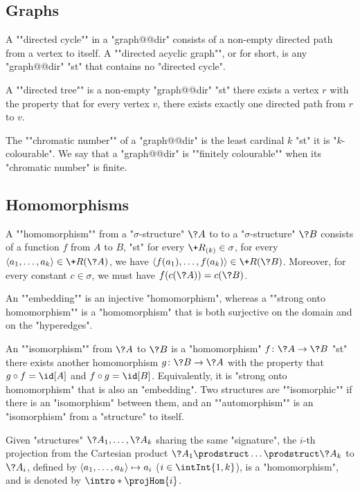 \subsection{Graphs}

A \AP""directed cycle"" in a "graph@@dir" consists
of a non-empty directed path from a vertex to itself.
A ""directed acyclic graph"", or  for short,
is any "graph@@dir" "st" that contains no "directed cycle".

A ""directed tree"" is a non-empty "graph@@dir" "st" there exists 
a vertex $r$ with the property that for every vertex $v$,
there exists exactly one directed path from $r$ to $v$.

The ""chromatic number"" of a "graph@@dir" is the least cardinal $k$
"st" it is "$k$-colourable". We say that a "graph@@dir"
is \AP""finitely colourable"" when its "chromatic number" is finite.


\subsection{Homomorphisms}

A \AP""homomorphism"" from a "$\sigma$-structure" $\?A$ to
to a "$\sigma$-structure" $\?B$ consists of a function $f$ from $A$ to $B$,
"st" for every $\+R_{(k)} \in \sigma$, for every $\tup{a_1,\dotsc,a_k} \in \+R(\?A)$,
we have $\tup{f(a_1), \dotsc, f(a_k)} \in \+R(\?B)$. Moreover, for every
constant $c \in \sigma$, we must have $f(c(\?A)) = c(\?B)$.

An \AP""embedding"" is an injective "homomorphism",
whereas a \AP""strong onto homomorphism"" is a "homomorphism" that is both
surjective on the domain and on the "hyperedges". 

An \AP""isomorphism"" from $\?A$ to $\?B$ is a "homomorphism" $f\colon \?A \to \?B$
"st" there exists another homomorphism $g\colon \?B \to \?A$ with the property
that $g \circ f = \id[A]$ and $f \circ g = \id[B]$. Equivalently,
it is "strong onto homomorphism" that is also an "embedding".
Two structures are \AP""isomorphic"" if there is an "isomorphism" between them,
and an ""automorphism"" is an "isomorphism" from a "structure" to itself.

Given "structures" $\?A_1, \dotsc, \?A_k$ sharing the same "signature",
the $i$-th projection from the Cartesian product $\?A_1 \prodstruct \dotsc \prodstruct \?A_k$
to $\?A_i$, defined by $\langle a_1,\dotsc,a_k\rangle \mapsto a_i$ ($i \in \intInt{1,k}$),
is a "homomorphism", and is denoted by \AP$\intro*\projHom{i}$.

